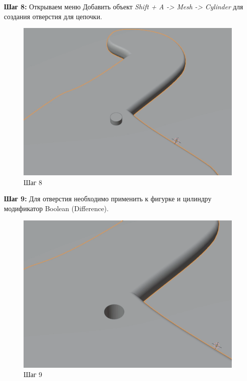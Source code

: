\documentclass[areasetadvanced]{scrartcl}
\begin{document}
\par \textbf{Шаг 8:} Открываем меню Добавить объект \textit{Shift + A -> Mesh ->  Cylinder} для создания отверстия для цепочки.
\begin{figure}[H]
    \label{4} 
    \centering
    \includegraphics[width=0.8\linewidth]{dino/8.png}
    \caption{Шаг 8}
\end{figure}

\par \textbf{Шаг 9:} Для отверстия необходимо применить к фигурке и цилиндру модификатор Boolean (Difference).
\begin{figure}[H]
    \label{4} 
    \centering
    \includegraphics[width=0.8\linewidth]{dino/9.png}
    \caption{Шаг 9}
\end{figure}
\end{document}
